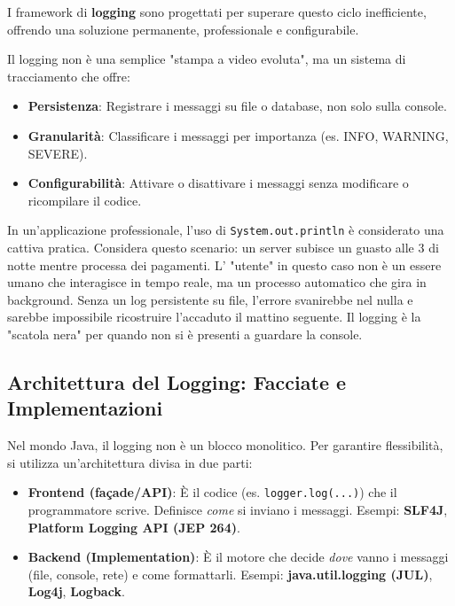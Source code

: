 I framework di \textbf{logging} sono progettati per superare questo ciclo inefficiente, offrendo una soluzione permanente, professionale e configurabile.

Il logging non è una semplice "stampa a video evoluta", ma un sistema di tracciamento che offre:
\begin{itemize}
    \item \textbf{Persistenza}: Registrare i messaggi su file o database, non solo sulla console.
    \item \textbf{Granularità}: Classificare i messaggi per importanza (es. INFO, WARNING, SEVERE).
    \item \textbf{Configurabilità}: Attivare o disattivare i messaggi senza modificare o ricompilare il codice.
\end{itemize}

\medskip

In un'applicazione professionale, l'uso di \texttt{System.out.println} è considerato una cattiva pratica. Considera questo scenario: un server subisce un guasto alle 3 di notte mentre processa dei pagamenti. L' "utente" in questo caso non è un essere umano che interagisce in tempo reale, ma un processo automatico che gira in background. Senza un log persistente su file, l'errore svanirebbe nel nulla e sarebbe impossibile ricostruire l'accaduto il mattino seguente. Il logging è la "scatola nera" per quando non si è presenti a guardare la console.

\subsection{Architettura del Logging: Facciate e Implementazioni}

Nel mondo Java, il logging non è un blocco monolitico. Per garantire flessibilità, si utilizza un'architettura divisa in due parti:

\begin{itemize}
    \item \textbf{Frontend (façade/API)}: È il codice (es. \texttt{logger.log(...)}) che il programmatore scrive. Definisce \textit{come} si inviano i messaggi. Esempi: \textbf{SLF4J}, \textbf{Platform Logging API (JEP 264)}.
    \item \textbf{Backend (Implementation)}: È il motore che decide \textit{dove} vanno i messaggi (file, console, rete) e come formattarli. Esempi: \textbf{java.util.logging (JUL)}, \textbf{Log4j}, \textbf{Logback}.
\end{itemize}


